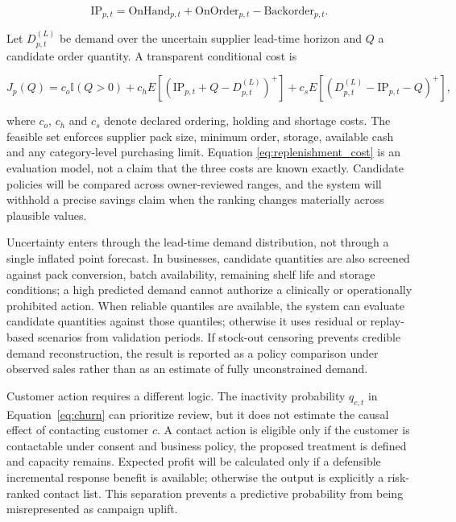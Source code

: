 \begin{equation}
\mathrm{IP}_{p,t}=\mathrm{OnHand}_{p,t}+\mathrm{OnOrder}_{p,t}
-\mathrm{Backorder}_{p,t}.
\label{eq:inventory_position}
\end{equation}

Let $D_{p,t}^{(L)}$ be demand over the uncertain supplier lead-time horizon and
$Q$ a candidate order quantity. A transparent conditional cost is

\begin{equation}
J_p(Q)=c_o\mathbb{I}(Q>0)
+c_hE[(\mathrm{IP}_{p,t}+Q-D_{p,t}^{(L)})^+]
+c_sE[(D_{p,t}^{(L)}-\mathrm{IP}_{p,t}-Q)^+],
\label{eq:replenishment_cost}
\end{equation}

where $c_o$, $c_h$ and $c_s$ denote declared ordering, holding and shortage
costs. The feasible set enforces supplier pack size, minimum order, storage,
available cash and any category-level purchasing limit. Equation
\ref{eq:replenishment_cost} is an evaluation model, not a claim that the three
costs are known exactly. Candidate policies will be compared across
owner-reviewed ranges, and the system will withhold a precise savings claim
when the ranking changes materially across plausible values.

Uncertainty enters through the lead-time demand distribution, not through a
single inflated point forecast. In businesses, candidate quantities are also
screened against pack conversion, batch availability, remaining shelf life and
storage conditions; a high predicted demand cannot authorize a clinically or
operationally prohibited action. When reliable quantiles are available, the
system can evaluate candidate quantities against those quantiles; otherwise it
uses residual or replay-based scenarios from validation periods. If stock-out
censoring prevents credible demand reconstruction, the result is reported as a
policy comparison under observed sales rather than as an estimate of fully
unconstrained demand.

Customer action requires a different logic. The inactivity probability
$q_{c,t}$ in Equation~\ref{eq:churn} can prioritize review, but it does not
estimate the causal effect of contacting customer $c$. A contact action is
eligible only if the customer is contactable under consent and business policy,
the proposed treatment is defined and capacity remains. Expected profit will be
calculated only if a defensible incremental response benefit is available;
otherwise the output is explicitly a risk-ranked contact list. This separation
prevents a predictive probability from being misrepresented as campaign uplift.

